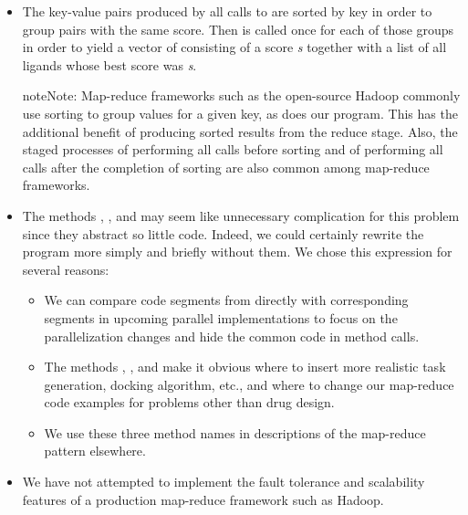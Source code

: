 \documentclass[letterpaper,10pt,openany,oneside]{sphinxmanual}
\begin{document}
\begin{itemize}
\item {} 
The key-value pairs produced by all calls to  are sorted by key in order to group pairs with the same score. Then  is called once for each of those groups in order to yield a vector of  consisting of a score \emph{s} together with a list of all ligands whose best score was \emph{s}.

\begin{notice}{note}{Note:}
Map-reduce frameworks such as the open-source Hadoop commonly use sorting to group values for a given key, as does our program. This has the additional benefit of producing sorted results from the reduce stage. Also, the staged processes of performing all  calls before sorting and of performing all  calls after the completion of sorting are also common among map-reduce frameworks.
\end{notice}

\item {} 
The methods , , and  may seem like unnecessary complication for this problem since they abstract so little code. Indeed, we could certainly rewrite the program more simply and briefly without them. We chose this expression for several reasons:
\begin{itemize}
\item {} 
We can compare code segments from  directly with corresponding segments in upcoming parallel implementations to focus on the parallelization changes and hide the common code in method calls.

\item {} 
The methods , , and  make it obvious where to insert more realistic task generation, docking algorithm, etc., and where to change our map-reduce code examples for problems other than drug design.

\item {} 
We use these three method names in descriptions of the map-reduce pattern elsewhere.

\end{itemize}

\item {} 
We have not attempted to implement the fault tolerance and scalability features of a production map-reduce framework such as Hadoop.

\end{itemize}
\end{document}
